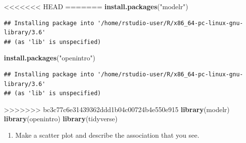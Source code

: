 \documentclass[]{article}
\newenvironment{Shaded}{\begin{snugshade}}{\end{snugshade}}
\newcommand{\DataTypeTok}[1]{\textcolor[rgb]{0.13,0.29,0.53}{#1}}
\newcommand{\KeywordTok}[1]{\textcolor[rgb]{0.13,0.29,0.53}{\textbf{#1}}}
\newcommand{\NormalTok}[1]{#1}
\newcommand{\OperatorTok}[1]{\textcolor[rgb]{0.81,0.36,0.00}{\textbf{#1}}}
\newcommand{\StringTok}[1]{\textcolor[rgb]{0.31,0.60,0.02}{#1}}
\providecommand{\tightlist}{%
  \setlength{\itemsep}{0pt}\setlength{\parskip}{0pt}}
\begin{document}
\begin{Shaded}
\begin{Highlighting}[]
<<<<<<< HEAD
=======
\KeywordTok{install.packages}\NormalTok{(}\StringTok{"modelr"}\NormalTok{)}
\end{Highlighting}
\end{Shaded}

\begin{verbatim}
## Installing package into '/home/rstudio-user/R/x86_64-pc-linux-gnu-library/3.6'
## (as 'lib' is unspecified)
\end{verbatim}

\begin{Shaded}
\begin{Highlighting}[]
\KeywordTok{install.packages}\NormalTok{(}\StringTok{"openintro"}\NormalTok{)}
\end{Highlighting}
\end{Shaded}

\begin{verbatim}
## Installing package into '/home/rstudio-user/R/x86_64-pc-linux-gnu-library/3.6'
## (as 'lib' is unspecified)
\end{verbatim}

\begin{Shaded}
\begin{Highlighting}[]
>>>>>>> bc3c77c6e31439362ddd1b04c00724b4e550e915
\KeywordTok{library}\NormalTok{(modelr)}
\KeywordTok{library}\NormalTok{(openintro)}
\KeywordTok{library}\NormalTok{(tidyverse)}
\end{Highlighting}
\end{Shaded}

\begin{enumerate}
\def\labelenumi{\arabic{enumi}.}
\setcounter{enumi}{1}
\tightlist
\item
  Make a scatter plot and describe the association that you see.
\end{enumerate}

\begin{Shaded}
\end{Shaded}
\end{document}
